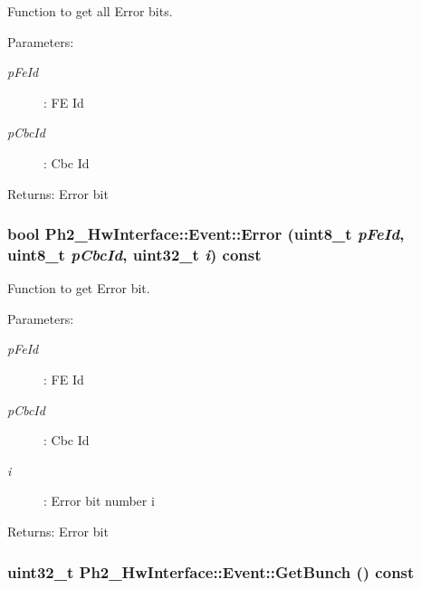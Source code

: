 Function to get all Error bits. 

\begin{Desc}
\item[Parameters:]
\begin{description}
\item[{\em p\-Fe\-Id}]: FE Id \item[{\em p\-Cbc\-Id}]: Cbc Id \end{description}
\end{Desc}
\begin{Desc}
\item[Returns:]Error bit \end{Desc}
\hypertarget{class_ph2___hw_interface_1_1_event_e0242a4b78e3da2959a2bcfb8adb86f9}{
\subsubsection[Error]{\setlength{\rightskip}{0pt plus 5cm}bool Ph2\_\-Hw\-Interface::Event::Error (uint8\_\-t {\em p\-Fe\-Id}, uint8\_\-t {\em p\-Cbc\-Id}, uint32\_\-t {\em i}) const}}
\label{class_ph2___hw_interface_1_1_event_e0242a4b78e3da2959a2bcfb8adb86f9}


Function to get Error bit. 

\begin{Desc}
\item[Parameters:]
\begin{description}
\item[{\em p\-Fe\-Id}]: FE Id \item[{\em p\-Cbc\-Id}]: Cbc Id \item[{\em i}]: Error bit number i \end{description}
\end{Desc}
\begin{Desc}
\item[Returns:]Error bit \end{Desc}
\hypertarget{class_ph2___hw_interface_1_1_event_b577a18ce8a9edc17debb67ea8734530}{
\subsubsection[GetBunch]{\setlength{\rightskip}{0pt plus 5cm}uint32\_\-t Ph2\_\-Hw\-Interface::Event::Get\-Bunch () const}}
\label{class_ph2___hw_interface_1_1_event_b577a18ce8a9edc17debb67ea8734530}


